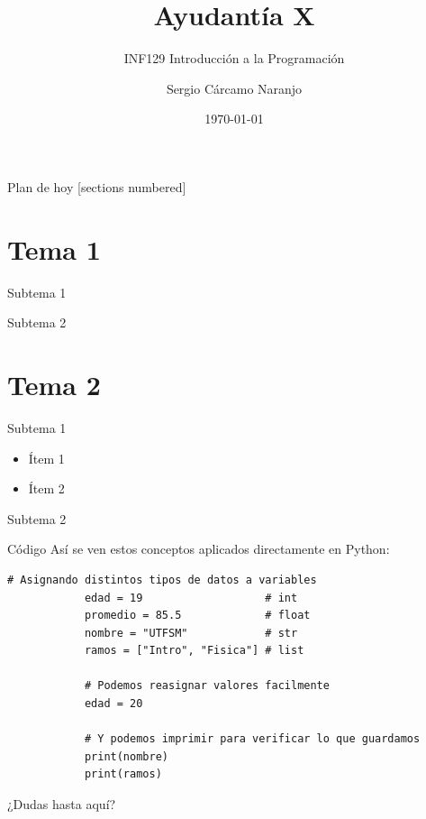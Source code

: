 \documentclass[aspectratio=169, 11pt]{beamer}
\title{Ayudantía X}
\subtitle{INF129 Introducción a la Programación}
\author{Sergio Cárcamo Naranjo}
\institute{DI - Universidad Técnica Federico Santa María}
\date{\today}
\begin{document}
	
	\maketitle
	
	\begin{frame}{Plan de hoy}
		[sections numbered]
		\tableofcontents[hideallsubsections]
	\end{frame}
	
	\section{Tema 1}
	
	\begin{frame}{Subtema 1}

	\end{frame}
	
		\begin{frame}{Subtema 2}
		
	\end{frame}
	
	\section{Tema 2}
	
	\begin{frame}{Subtema 1}

		\begin{itemize}
			\item Ítem 1
			\item Ítem 2
		\end{itemize}

	\end{frame}
	
	\begin{frame}{Subtema 2}

	\end{frame}
	
	\begin{frame}[fragile]{Código}
		Así se ven estos conceptos aplicados directamente en Python:
		
		\begin{lstlisting}[gobble=4]
			# Asignando distintos tipos de datos a variables
			edad = 19                   # int
			promedio = 85.5             # float
			nombre = "UTFSM"            # str
			ramos = ["Intro", "Fisica"] # list
			
			# Podemos reasignar valores facilmente
			edad = 20
			
			# Y podemos imprimir para verificar lo que guardamos
			print(nombre)
			print(ramos)
		\end{lstlisting}
	\end{frame}
	
	\begin{frame}[standout]
		¿Dudas hasta aquí?
	\end{frame}
	
\end{document}
